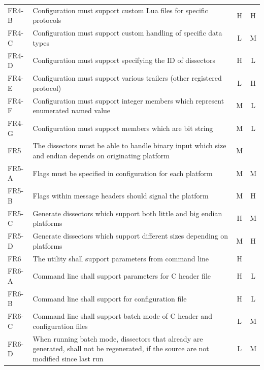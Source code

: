 \begin{table}[htbp]
{\begin{tabularx}{1.2\textwidth}{l X c c}
	FR4-B & Configuration must support custom Lua files for specific protocols & H & H \\
	FR4-C & Configuration must support custom handling of specific data types & L & M \\
	FR4-D & Configuration must support specifying the ID of dissectors & H & L \\
	FR4-E & Configuration must support various trailers (other registered protocol) & L & H \\
	FR4-F & Configuration must support integer members which represent enumerated named value & M & L \\	
	FR4-G & Configuration must support members which are bit string & M & L \\
	\midrule
	FR5 & The dissectors must be able to handle binary input which size and endian depends on originating platform & M & \\
	FR5-A & Flags must be specified in configuration for each platform & M & M \\
	FR5-B & Flags within message headers should signal the platform & M & H \\
	FR5-C & Generate dissectors which support both little and big endian platforms & H & M \\
	FR5-D & Generate dissectors which support different sizes depending on platforms & M & H \\
	\midrule
	FR6 & The utility shall support parameters from command line & H & \\
	FR6-A & Command line shall support parameters for C header file & H & L \\
	FR6-B & Command line shall support for configuration file & H & L \\
	FR6-C & Command line shall support batch mode of C header and configuration files & L & M \\
	FR6-D & When running batch mode, dissectors that already are generated, shall not be regenerated, if the source are not modified since last run & L & M \\
	\bottomrule
\end{tabularx}}
\end{table}

